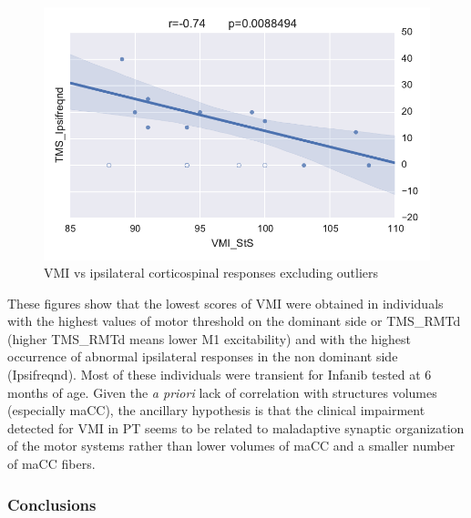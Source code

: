 \documentclass[twocolumn]{svjour3}
\begin{document}
\begin{figure}
	\centering
		\includegraphics[width=0.9\linewidth]{corr_cyril_2}
	\caption{VMI vs ipsilateral corticospinal responses excluding outliers}
	\label{fig_cyril_5}
\end{figure}

These figures show that the lowest scores of VMI were obtained in individuals with the highest values of motor threshold on the dominant side or TMS\_RMTd (higher TMS\_RMTd means lower M1 excitability) and with the highest occurrence of abnormal ipsilateral responses in the non dominant side (Ipsifreqnd). Most of these individuals were transient for Infanib tested at 6 months of age. Given the \emph{a priori} lack of correlation with structures volumes (especially maCC), the ancillary hypothesis is that the clinical impairment detected for VMI in PT seems to be related to maladaptive synaptic organization of the motor systems rather than lower volumes of maCC and a smaller number of maCC fibers.

\subsubsection{Conclusions}
\end{document}
